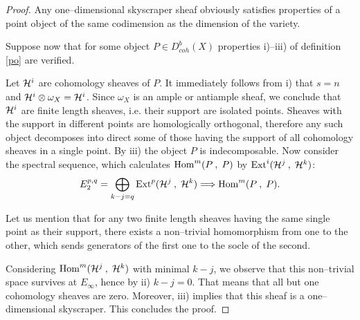 \documentclass[12pt]{article}
\def\db#1{ D^b_{coh}({#1})}
\begin{document}
\begin{proof}
Any one--dimensional skyscraper sheaf obviously satisfies properties of a point object of the same codimension as the dimension of the variety.

Suppose now that for some object $P\in\db{X}$ properties i)--iii) of definition \ref{po} are verified.

Let ${\cal H}^i$ are cohomology sheaves of $P$. It immediately follows from i) that $s=n$ and ${\cal H}^i\otimes \omega_X={\cal H}^i$. Since $\omega_X$ is an ample or antiample sheaf, we conclude that ${\cal H}^i$ are finite
length sheaves, i.e. their support are isolated points. Sheaves with the support in different points are homologically orthogonal, therefore any  such object decomposes into direct some of those having the support of all cohomology sheaves in a single point. By iii) the object $P$ is indecomposable. Now consider the spectral sequence, which calculates ${\rm Hom}^m( P\:, \; P)$ by ${\rm Ext}^i( {\cal H}^j\:,\; {\cal H}^k)$:
$$
E^{p,q}_2= \bigoplus_{k-j=q}{\rm Ext}^p({\cal H}^j\:,\; {\cal H}^k) \Longrightarrow {\rm Hom}^m( P\:, \; P).
$$

Let us mention that for any two finite length sheaves having the same single point as their support, there exists a  non--trivial homomorphism from one to the other, which 
sends   generators of the first one to the socle of the second.

Considering ${\rm Hom}^m({\cal H}^j \:, \; {\cal H}^k)$ with minimal $k-j$, we observe that this non--trivial space survives at $E_{\infty}$, hence by ii) $k-j=0$. That means that all but one cohomology sheaves are zero. Moreover, iii) implies that this sheaf is a one--dimensional skyscraper. This concludes the proof.
\end{proof}
\end{document}
